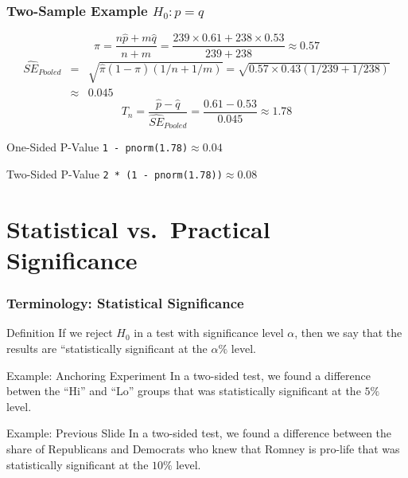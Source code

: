 \begin{frame}
	\frametitle{Two-Sample Example $H_0\colon p = q$}
	\small
$$\widehat{\pi} = \frac{n\widehat{p}+ m\widehat{q}}{n + m} = \frac{239 \times 0.61 + 238 \times 0.53}{239 + 238}\approx 0.57$$
	\begin{eqnarray*}
	\widehat{SE}_{Pooled} &=&  \sqrt{\widehat{\pi}(1-\widehat{\pi})\left( 1/n + 1/m \right) }= \sqrt{0.57 \times 0.43 (1/239 + 1/238)}\\
		&\approx& 0.045
	\end{eqnarray*}
$$T_n = \frac{\widehat{p} - \widehat{q}}{\widehat{SE}_{Pooled}}= \frac{0.61 - 0.53}{0.045} \approx 1.78$$

\vspace{-1em}
\begin{block}
	{One-Sided P-Value}
	\texttt{1 - pnorm(1.78)}$\approx 0.04$
\end{block}\begin{block}
	{Two-Sided P-Value}
	\texttt{2 * (1 - pnorm(1.78))}$\approx 0.08$
\end{block}
\end{frame}
\section{Statistical vs.\ Practical Significance}
\begin{frame}
\frametitle{Terminology: Statistical Significance}

\begin{alertblock}{Definition}
  If we reject $H_0$ in a test with significance level $\alpha$, then we say that the results are ``statistically significant at the $\alpha\%$ level. 
\end{alertblock}

\pause

\begin{block}{Example: Anchoring Experiment} 
  In a two-sided test, we found a difference betwen the ``Hi'' and ``Lo'' groups that was statistically significant at the $5\%$ level.
\end{block}

\pause

\begin{block}{Example: Previous Slide}
  In a two-sided test, we found a difference between the share of Republicans and Democrats who knew that Romney is pro-life that was statistically significant at the $10\%$ level.
\end{block}

\end{frame}

